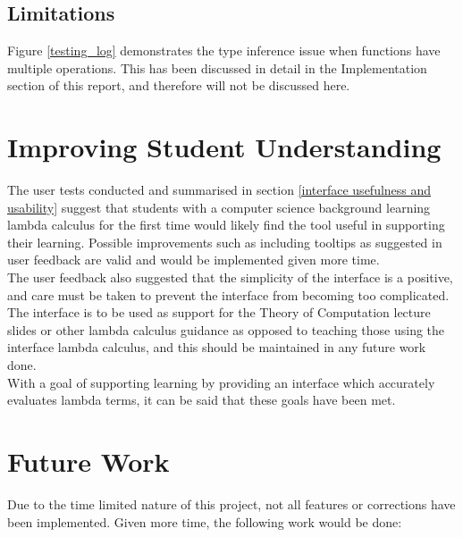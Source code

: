 \documentclass[a4paper,11pt]{report}
\begin{document}
\subsection{Limitations}
Figure \ref{testing_log} demonstrates the type inference issue when functions have multiple operations. This has been discussed in detail in the Implementation section of this report, and therefore will not be discussed here.

\section{Improving Student Understanding}
The user tests conducted and summarised in section \ref{interface usefulness and usability} suggest that students with a computer science background learning lambda calculus for the first time would likely find the tool useful in supporting their learning. Possible improvements such as including tooltips as suggested in user feedback are valid and would be implemented given more time.\\

The user feedback also suggested that the simplicity of the interface is a positive, and care must be taken to prevent the interface from becoming too complicated. The interface is to be used as support for the Theory of Computation lecture slides or other lambda calculus guidance as opposed to teaching those using the interface lambda calculus, and this should be maintained in any future work done.\\

With a goal of supporting learning by providing an interface which accurately evaluates lambda terms, it can be said that these goals have been met.

\section{Future Work}
Due to the time limited nature of this project, not all features or corrections have been implemented. Given more time, the following work would be done:
\end{document}
